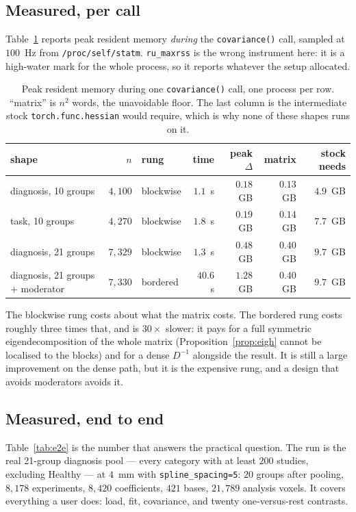 \documentclass[11pt,a4paper]{article}
\theoremstyle{plain}
\theoremstyle{definition}
\begin{document}
\subsection{Measured, per call}

Table~\ref{tab:memory} reports peak resident memory \emph{during} the \texttt{covariance()} call,
sampled at $100$~Hz from \texttt{/proc/self/statm}. \texttt{ru\_maxrss} is the wrong instrument
here: it is a high-water mark for the whole process, so it reports whatever the setup allocated.

\begin{table}[htbp]
\centering
\caption{Peak resident memory during one \texttt{covariance()} call, one process per row.
``matrix'' is $n^2$ words, the unavoidable floor. The last column is the intermediate stock
\texttt{torch.func.hessian} would require, which is why none of these shapes runs on it.}
\label{tab:memory}
\begin{tabular}{lrlrrrr}
\toprule
shape & $n$ & rung & time & peak $\Delta$ & matrix & stock needs\\
\midrule
diagnosis, 10 groups & $4{,}100$ & blockwise & $1.1$~s & $0.18$~GB & $0.13$~GB & $4.9$~GB\\
task, 10 groups & $4{,}270$ & blockwise & $1.8$~s & $0.19$~GB & $0.14$~GB & $7.7$~GB\\
diagnosis, 21 groups & $7{,}329$ & blockwise & $1.3$~s & $0.48$~GB & $0.40$~GB & $9.7$~GB\\
diagnosis, 21 groups $+$ moderator & $7{,}330$ & bordered & $40.6$~s & $1.28$~GB & $0.40$~GB & $9.7$~GB\\
\bottomrule
\end{tabular}
\end{table}

The blockwise rung costs about what the matrix costs. The bordered rung costs roughly three
times that, and is $30\times$ slower: it pays for a full symmetric eigendecomposition of the
whole matrix (Proposition~\ref{prop:eigh} cannot be localised to the blocks) and for a dense
$D^{-1}$ alongside the result. It is still a large improvement on the dense path, but it is the
expensive rung, and a design that avoids moderators avoids it.

\subsection{Measured, end to end}

Table~\ref{tab:e2e} is the number that answers the practical question. The run is the real
21-group diagnosis pool --- every category with at least $200$ studies, excluding Healthy ---
at $4$~mm with \texttt{spline\_spacing=5}: $20$ groups after pooling, $8{,}178$ experiments,
$8{,}420$ coefficients, $421$ bases, $21{,}789$ analysis voxels. It covers everything a user
does: load, fit, covariance, and twenty one-versus-rest contrasts.
\end{document}
